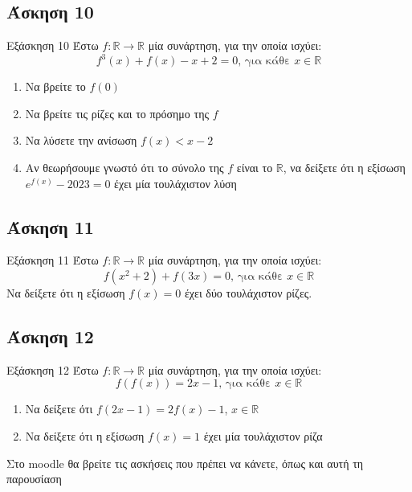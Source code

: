 \documentclass[greek]{beamer}
\begin{document}
\subsection{Άσκηση 10}
\begin{frame}[label=Άσκηση10,t]{Εξάσκηση 10}
      Έστω $f:\mathbb{R}\to\mathbb{R}$ μία συνάρτηση, για την οποία ισχύει:
      $$f^3(x)+f(x)-x+2=0\text{, για κάθε } x\in\mathbb{R}$$
      \begin{enumerate}
            \item<1-> Να βρείτε το $f(0)$
            \item<2-> Να βρείτε τις ρίζες και το πρόσημο της $f$
            \item<3-> Να λύσετε την ανίσωση $f(x)<x-2$
            \item<4-> Αν θεωρήσουμε γνωστό ότι το σύνολο της $f$ είναι το $\mathbb{R}$, να δείξετε ότι η εξίσωση $e^{f(x)}-2023=0$ έχει μία τουλάχιστον λύση
      \end{enumerate}

\end{frame}

\subsection{Άσκηση 11}
\begin{frame}[label=Άσκηση11,t]{Εξάσκηση 11}
      Έστω $f:\mathbb{R}\to\mathbb{R}$ μία συνάρτηση, για την οποία ισχύει:
      $$f(x^2+2)+f(3x)=0 \text{, για κάθε } x\in\mathbb{R}$$
      Να δείξετε ότι η εξίσωση $f(x)=0$ έχει δύο τουλάχιστον ρίζες.

\end{frame}

\subsection{Άσκηση 12}
\begin{frame}[label=Άσκηση12,t]{Εξάσκηση 12}
      Έστω $f:\mathbb{R}\to\mathbb{R}$ μία συνάρτηση, για την οποία ισχύει:
      $$f\left(f(x)\right)=2x-1\text{, για κάθε } x\in\mathbb{R}$$
      \begin{enumerate}
            \item<1-> Να δείξετε ότι $f(2x-1)=2f(x)-1$, $x\in\mathbb{R}$
            \item<2-> Να δείξετε ότι η εξίσωση $f(x)=1$ έχει μία τουλάχιστον ρίζα
      \end{enumerate}

\end{frame}

\begin{frame}
      Στο moodle θα βρείτε τις ασκήσεις που πρέπει να κάνετε, όπως και αυτή τη παρουσίαση
\end{frame}
\end{document}
